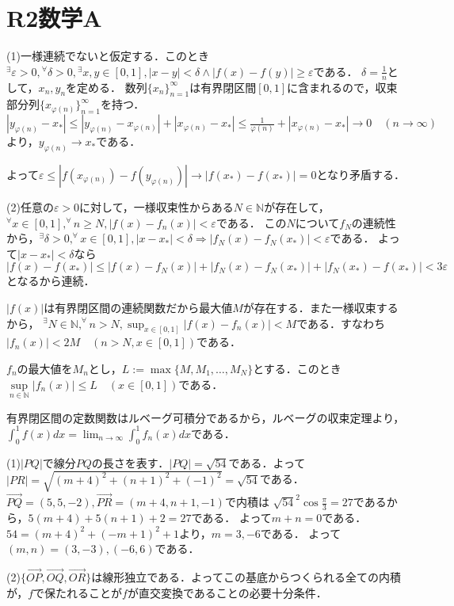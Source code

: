 \documentclass[
		book,
		head_space=20mm,
		foot_space=20mm,
		gutter=10mm,
		line_length=190mm
]{jlreq}
\begin{document}
\section{R2数学A}
(1)一様連続でないと仮定する．このとき
${}^\exists \varepsilon>0,{}^\forall \delta>0,{}^\exists x,y\in [0,1],|x-y|<\delta \land |f(x)-f(y)|\geq \varepsilon$である．
$\delta=\frac{1}{n}$として，$x_n,y_n$を定める．
数列$\{x_n\}_{n=1}^\infty$は有界閉区間$[0,1]$に含まれるので，収束部分列$\{x_{\varphi(n)}\}_{n=1}^\infty$を持つ．$|y_{\varphi(n)}-x_*|\le |y_{\varphi(n)}-x_{\varphi(n)}|+|x_{\varphi(n)}-x_*|\le \frac{1}{\varphi(n)}+|x_{\varphi(n)}-x_*|\rightarrow 0 \quad(n\rightarrow \infty)$より，$y_{\varphi(n)}\rightarrow x_*$である．

よって$\varepsilon\le |f(x_{\varphi(n)})-f(y_{\varphi(n)})|\rightarrow |f(x_*)-f(x_*)|=0$となり矛盾する．

(2)任意の$\varepsilon>0$に対して，一様収束性からある$N \in \mathbb{N}$が存在して，$^\forall x \in [0,1],^\forall n\ge N,|f(x)-f_n(x)|<\varepsilon$である．
この$N$について$f_N$の連続性から，$^\exists \delta>0,^\forall x\in [0,1],|x-x_*|<\delta \Rightarrow |f_N(x)-f_N(x_*)|<\varepsilon$である．
よって$|x-x_*|<\delta $なら$|f(x)-f(x_*)|\le |f(x)-f_N(x)|+|f_N(x)-f_N(x_*)|+|f_N(x_*)-f(x_*)|<3\varepsilon$となるから連続．

$|f(x)|$は有界閉区間の連続関数だから最大値$M$が存在する．また一様収束するから，
$^\exists N\in \mathbb{N},^\forall n>N,\sup_{x\in [0,1]}|f(x)-f_n(x)|<M$である．すなわち$|f_n(x)|<2M \quad (n > N,x\in [0,1])$である．

$f_n$の最大値を$M_n$とし，$L:=\max\{ M,M_1,\dots,M_N\}$とする．このとき$\sup\limits_{n \in \mathbb{N}}|f_n(x)|\le L \quad(x\in [0,1])$である．

有界閉区間の定数関数はルベーグ可積分であるから，ルベーグの収束定理より，
$\int_0^1 f(x)dx=\lim_{n\rightarrow \infty}\int_0^1 f_n(x)dx$である．

(1)$|PQ|$で線分$PQ$の長さを表す．$|PQ|=\sqrt{54}$である．よって$|PR|=\sqrt{(m+4)^2+(n+1)^2+(-1)^2}=\sqrt{54}$である．
$\overrightarrow{PQ}=(5,5,-2),\overrightarrow{PR}=(m+4,n+1,-1)$で内積は
$\sqrt{54}^2\cos \frac{\pi}{3}=27$であるから，$5(m+4)+5(n+1)+2=27$である．
よって$m+n=0$である．
$54=(m+4)^2+(-m+1)^2+1$より，$m=3,-6$である．
よって$(m,n)=(3,-3),(-6,6)$である．

(2)$\{\overrightarrow{OP},\overrightarrow{OQ},\overrightarrow{OR}\}$は線形独立である．よってこの基底からつくられる全ての内積が，$f$で保たれることが$f$が直交変換であることの必要十分条件．
\end{document}
